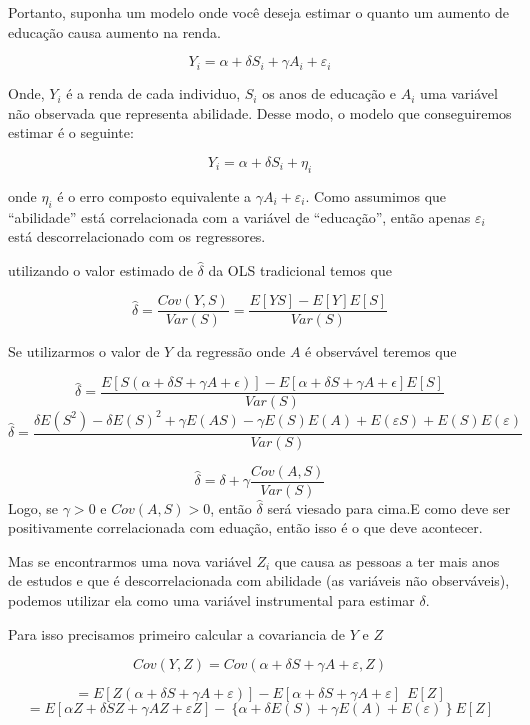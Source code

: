 \documentclass[
]{article}
\begin{document}
Portanto, suponha um modelo onde você deseja estimar o quanto um aumento
de educação causa aumento na renda.

\[ Y_i = \alpha + \delta S_i + \gamma A_i + \varepsilon_i\]

Onde, \(Y_i\) é a renda de cada individuo, \(S_i\) os anos de educação e
\(A_i\) uma variável não observada que representa abilidade. Desse modo,
o modelo que conseguiremos estimar é o seguinte:

\[ Y_i = \alpha + \delta S_i + \eta_i\]

onde \(\eta_i\) é o erro composto equivalente a
\(\gamma A_i + \varepsilon_i\). Como assumimos que ``abilidade'' está
correlacionada com a variável de ``educação'', então apenas
\(\varepsilon_i\) está descorrelacionado com os regressores.

utilizando o valor estimado de \(\hat{\delta}\) da OLS tradicional temos
que

\[ \hat{\delta} =  \frac{Cov(Y,S)}{Var(S)} = \frac{E[YS]- E[Y] E[S]}{Var(S)}\]

Se utilizarmos o valor de \(Y\) da regressão onde \(A\) é observável
teremos que

\[ \hat{\delta} =  \frac{E[S (\alpha +\delta S + \gamma A + \epsilon)] - E[\alpha + \delta S + \gamma A + \epsilon] E[S]}{Var(S)}\]
\[ \hat{\delta} =  \frac{\delta E(S^2) - \delta E(S)^2 + \gamma E(AS) - \gamma E(S) E (A) + E(\varepsilon S)+ E(S) E(\varepsilon)}{Var(S)}\]

\[ \hat{\delta} =  \delta + \gamma\frac{Cov(A,S)}{Var(S)}\] Logo, se
\(\gamma > 0\) e \(Cov(A,S) > 0\), então \(\hat{\delta}\) será viesado
para cima.E como deve ser positivamente correlacionada com eduação,
então isso é o que deve acontecer.

Mas se encontrarmos uma nova variável \(Z_i\) que causa as pessoas a ter
mais anos de estudos e que é descorrelacionada com abilidade (as
variáveis não observáveis), podemos utilizar ela como uma variável
instrumental para estimar \(\delta\).

Para isso precisamos primeiro calcular a covariancia de \(Y\) e \(Z\)

\[ Cov(Y,Z) = Cov( \alpha + \delta S + \gamma A + \varepsilon, Z)\]

\[ = E[ Z (\alpha + \delta S + \gamma A + \varepsilon )] - E[\alpha + \delta S + \gamma A + \varepsilon ] \ \ E[Z]\]
\[ =  E[\alpha Z + \delta S Z + \gamma A Z + \varepsilon Z ] -  \ \{ \alpha + \delta E(S) + \gamma E(A) + E(\varepsilon)\ \} \ E[Z]\]
\end{document}
